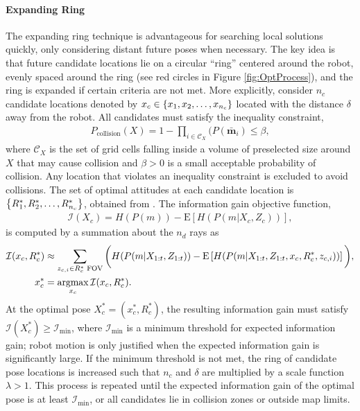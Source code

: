 \paragraph{Expanding Ring}
The expanding ring technique is advantageous for searching local solutions quickly, only considering distant future poses when necessary. The key idea is that future candidate locations lie on a circular ``ring'' centered around the robot, evenly spaced around the ring (see red circles in Figure \ref{fig:OptProcess}), and the ring is expanded if certain criteria are not met. More explicitly, consider $n_c$ candidate locations denoted by $x_c\in\left\{ x_1,x_2,\ldots,x_{n_c} \right\}$ located with the distance $\delta$ away from the robot. All candidates must satisfy the inequality constraint,
\begin{align}
\label{eqn:CollisionInequalityConstraint}
P_\text{collision}(X)=1-\prod_{i\in\mathcal C_X}(P(\bar{\mathbf{m}}_i)\leq\beta,
\end{align}
where $\mathcal C_X$ is the set of grid cells falling inside a volume of preselected size around $X$ that may cause collision and $\beta>0$ is a small acceptable probability of collision. Any location that violates an inequality constraint  is excluded to avoid collisions. The set of optimal attitudes at each candidate location is $\left\{ R^*_{1},R^*_{2},\ldots,R^*_{n_c} \right\}$, obtained from . The information gain objective function,
\begin{align}
\label{eqn:ObjFun}
\mathcal I(X_c)=H(P(m))-\text{E}\left[H(P(m|X_c,Z_c))\right],
\end{align}
is computed by a summation about the $n_d$ rays as %
\begin{align}
\label{eqn:ObjFunApprox}
\mathcal I(x_c,R_c^*)&\approx \sum_{z_{c,i}\in R_{c}^*\text{ FOV}}\bigg(H(P(m|X_{1:t},Z_{1:t}))-\text{E}\left[H(P(m|X_{1:t},Z_{1:t},x_c,R_c^*,z_{c,i}))\right]\bigg),
\\
x_c^*&=\argmax_{x_c}\mathcal I(x_c,R_c^*).
\end{align}
At the optimal pose $X^*_c=(x^*_c,R^*_c)$, the resulting information gain must satisfy $\mathcal I(X_c^*)\geq\mathcal I_\text{min}$, where $\mathcal I_\text{min}$ is a minimum threshold for expected information gain; robot motion is only justified when the expected information gain is significantly large. If the minimum threshold is not met, the ring of candidate pose locations is increased such that $n_c$ and $\delta$ are multiplied by a scale function $\lambda>1$.
This process is repeated until the expected information gain of the optimal pose is at least $\mathcal I_\text{min}$, or all candidates lie in collision zones or outside map limits. %

